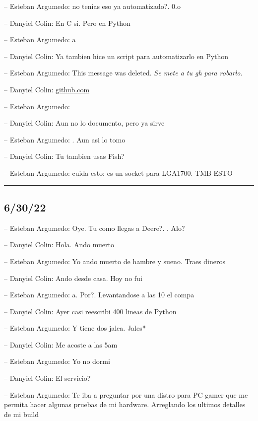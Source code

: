 -- Esteban Argumedo: no tenias eso ya automatizado?. 0.o

-- Danyiel Colin: En C si. Pero en Python

-- Esteban Argumedo: a

-- Danyiel Colin: Ya tambien hice un script para automatizarlo en Python

-- Esteban Argumedo: This message was deleted. \emph{\emph{Se mete a tu
gh para robarlo}}.

-- Danyiel Colin:
\href{https://github.com/DanEscher98/EmbeddedScripts/blob/main/Scripts/PyFish/newpy.fish}{github.com}

-- Esteban Argumedo:

-- Danyiel Colin: Aun no lo documento, pero ya sirve

-- Esteban Argumedo: . Aun asi lo tomo

-- Danyiel Colin: Tu tambien usas Fish?

-- Esteban Argumedo: cuida esto: es un socket para LGA1700. TMB ESTO

\begin{center}\rule{0.5\linewidth}{0.5pt}\end{center}

\hypertarget{section-113}{%
\subsection{6/30/22}\label{section-113}}

-- Esteban Argumedo: Oye. Tu como llegas a Deere?. . Alo?

-- Danyiel Colin: Hola. Ando muerto

-- Esteban Argumedo: Yo ando muerto de hambre y sueno. Traes dineros

-- Danyiel Colin: Ando desde casa. Hoy no fui

-- Esteban Argumedo: a. Por?. Levantandose a las 10 el compa

-- Danyiel Colin: Ayer casi reescribi 400 lineas de Python

-- Esteban Argumedo: Y tiene dos jalea. Jales*

-- Danyiel Colin: Me acoste a las 5am

-- Esteban Argumedo: Yo no dormi

-- Danyiel Colin: El servicio?

-- Esteban Argumedo: Te iba a preguntar por una distro para PC gamer que
me permita hacer algunas pruebas de mi hardware. Arreglando los ultimos
detalles de mi build

